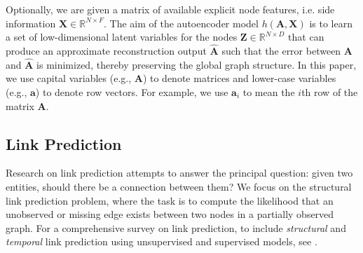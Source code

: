 \documentclass[letterpaper, conference]{IEEEtran}
\begin{document}
Optionally, we are given a matrix of available explicit node features, i.e. side information $\mathbf{X} \in \mathbb{R}^{N \times F}$. The aim of the autoencoder model $h(\mathbf{A,X})$ is to learn a set of low-dimensional latent variables for the nodes $\mathbf{Z} \in \mathbb{R}^{N \times D}$ that can produce an approximate reconstruction output $\mathbf{\hat{A}}$ such that the error between $\mathbf{A}$ and $\mathbf{\hat{A}}$ is minimized, thereby preserving the global graph structure. In this paper, we use capital variables (e.g., $\mathbf{A}$) to denote matrices and lower-case variables (e.g., $\mathbf{a}$) to denote row vectors. For example, we use $\mathbf{a}_i$ to mean the $i$th row of the matrix $\mathbf{A}$.

\subsection{Link Prediction}

Research on link prediction attempts to answer the principal question: given two entities, should there be a connection between them? We focus on the structural link prediction problem, where the task is to compute the likelihood that an unobserved or missing edge exists between two nodes in a partially observed graph. For a comprehensive survey on link prediction, to include \emph{structural} and \emph{temporal} link prediction using unsupervised and supervised models, see \cite{Wang:2014}. \\
\end{document}
